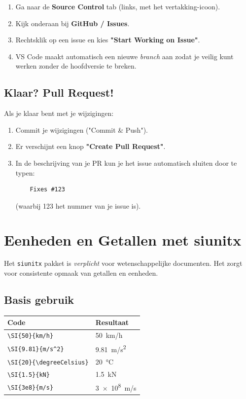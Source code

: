 \documentclass[a4paper,11pt]{article}
\begin{document}
\begin{enumerate}
    \item Ga naar de \textbf{Source Control} tab (links, met het vertakking-icoon).
    \item Kijk onderaan bij \textbf{GitHub / Issues}.
    \item Rechtsklik op een issue en kies \textbf{"Start Working on Issue"}.
    \item VS Code maakt automatisch een nieuwe \textit{branch} aan zodat je veilig kunt werken zonder de hoofdversie te breken.
\end{enumerate}

\subsection{Klaar? Pull Request!}

Als je klaar bent met je wijzigingen:

\begin{enumerate}
    \item Commit je wijzigingen ("Commit \& Push").
    \item Er verschijnt een knop \textbf{"Create Pull Request"}.
    \item In de beschrijving van je PR kun je het issue automatisch sluiten door te typen:
    \begin{verbatim}
    Fixes #123
    \end{verbatim}
    (waarbij 123 het nummer van je issue is).
\end{enumerate}

\section{Eenheden en Getallen met siunitx}
\label{sec:siunitx}

Het \texttt{siunitx} pakket is \emph{verplicht} voor wetenschappelijke documenten.
Het zorgt voor consistente opmaak van getallen en eenheden.

\subsection{Basis gebruik}

\begin{theorie}

\begin{tabular}{ll}
\toprule
\textbf{Code} & \textbf{Resultaat} \\
\midrule
\verb|\SI{50}{km/h}| & \SI{50}{km/h} \\
\verb|\SI{9.81}{m/s^2}| & \SI{9.81}{m/s^2} \\
\verb|\SI{20}{\degreeCelsius}| & \SI{20}{\degreeCelsius} \\
\verb|\SI{1.5}{kN}| & \SI{1.5}{kN} \\
\verb|\SI{3e8}{m/s}| & \SI{3e8}{m/s} \\
\bottomrule
\end{tabular}
\end{theorie}
\end{document}
